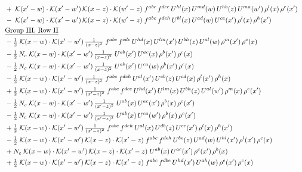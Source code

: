 \documentclass[9pt]{article}
\begin{document}
\begin{align}
&\quad +\;\mathcal{K}(x'-w)\cdot\mathcal{K}(x'-w')\,\mathcal{K}(x-z)\cdot\mathcal{K}(w'-z)\;f^{abc}\,f^{dce}\,U^{hl}(x)\,U^{md}(w)\,U^{hb}(z)\,U^{ma}(w')\,\rho^{l}(x)\,\rho^{e}(x')\notag\\
&\quad -\;\mathcal{K}(x'-w)\cdot\mathcal{K}(x'-w')\,\mathcal{K}(x-z)\cdot\mathcal{K}(w'-z)\;f^{abc}\,f^{deh}\,U^{bl}(x)\,U^{ad}(w)\,U^{ce}(x')\,\rho^{l}(x)\,\rho^{h}(x')\notag\\
&\quad\underline{\text{Group III, Row II}}\notag\\
&\quad -\tfrac{1}{2}\;\mathcal{K}(x-w)\cdot\mathcal{K}(x'-w')\,\tfrac{1}{(x-z)^{2}}\;f^{abc}\,f^{cde}\,U^{hd}(x)\,U^{lm}(x')\,U^{bh}(z)\,U^{al}(w)\,\rho^{m}(x')\,\rho^{e}(x)\notag\\
&\quad -\tfrac{1}{2}\,N_c\;\mathcal{K}(x-w)\cdot\mathcal{K}(x'-w')\,\tfrac{1}{(x-z)^{2}}\;U^{ab}(x')\,U^{ac}(x)\,\rho^{b}(x')\,\rho^{c}(x)\notag\\
&\quad -\tfrac{1}{2}\,N_c\;\mathcal{K}(x-w)\cdot\mathcal{K}(x'-w')\,\tfrac{1}{(x-z)^{2}}\;U^{ab}(x')\,U^{ca}(w)\,\rho^{b}(x')\,\rho^{c}(x)\notag\\
&\quad -\tfrac{1}{2}\;\mathcal{K}(x-w)\cdot\mathcal{K}(x'-w')\,\tfrac{1}{(x-z)^{2}}\;f^{abc}\,f^{deh}\,U^{al}(x')\,U^{eb}(z)\,U^{cd}(x)\,\rho^{l}(x')\,\rho^{h}(x)\notag\\
&\quad +\tfrac{1}{2}\;\mathcal{K}(x-w)\cdot\mathcal{K}(x'-w')\,\tfrac{1}{(x'-z)^{2}}\;f^{abc}\,f^{dce}\,U^{hd}(x')\,U^{lm}(x)\,U^{bh}(z)\,U^{al}(w')\,\rho^{m}(x)\,\rho^{e}(x')\notag\\
&\quad -\tfrac{1}{2}\,N_c\;\mathcal{K}(x-w)\cdot\mathcal{K}(x'-w')\,\tfrac{1}{(x'-z)^{2}}\;U^{ab}(x)\,U^{ac}(x')\,\rho^{b}(x)\,\rho^{c}(x')\notag\\
&\quad -\tfrac{1}{2}\,N_c\;\mathcal{K}(x-w)\cdot\mathcal{K}(x'-w')\,\tfrac{1}{(x'-z)^{2}}\;U^{ab}(x)\,U^{ca}(w')\,\rho^{b}(x)\,\rho^{c}(x')\notag\\
&\quad +\tfrac{1}{2}\;\mathcal{K}(x-w)\cdot\mathcal{K}(x'-w')\,\tfrac{1}{(x'-z)^{2}}\;f^{abc}\,f^{deh}\,U^{al}(x)\,U^{db}(z)\,U^{ce}(x')\,\rho^{l}(x)\,\rho^{h}(x')\notag\\
&\quad -\tfrac{1}{2}\;\mathcal{K}(x-w)\cdot\mathcal{K}(x'-w')\,\mathcal{K}(x-z)\cdot\mathcal{K}(x'-z)\;f^{abc}\,f^{deh}\,U^{be}(z)\,U^{ad}(w)\,U^{hl}(x')\,\rho^{l}(x')\,\rho^{c}(x)\notag\\
&\quad +N_c\;\mathcal{K}(x-w)\cdot\mathcal{K}(x'-w')\,\mathcal{K}(x-z)\cdot\mathcal{K}(x'-z)\;U^{ab}(x)\,U^{ac}(x')\,\rho^{c}(x')\,\rho^{b}(x)\notag\\
&\quad +\tfrac{1}{2}\;\mathcal{K}(x-w)\cdot\mathcal{K}(x'-w')\,\mathcal{K}(x-z)\cdot\mathcal{K}(x'-z)\;f^{abc}\,f^{dbe}\,U^{hd}(x')\,U^{ah}(w)\,\rho^{e}(x')\,\rho^{c}(x)\notag\\

\end{align}
\end{document}
